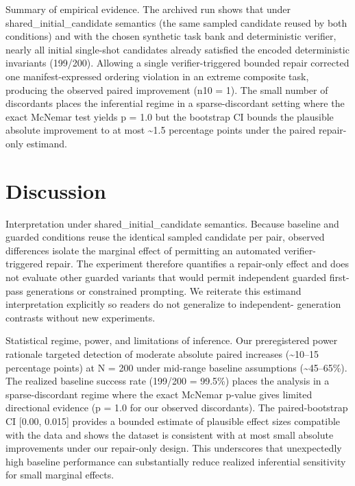 \documentclass[conference]{IEEEtran}
\begin{document}
Summary of empirical evidence. The archived run shows that under shared\_initial\_candidate semantics (the same sampled candidate reused by both conditions) and with the chosen synthetic task bank and deterministic verifier, nearly all initial single-shot candidates already satisfied the encoded deterministic invariants (199/200). Allowing a single verifier-triggered bounded repair corrected one manifest-expressed ordering violation in an extreme composite task, producing the observed paired improvement (n10 = 1). The small number of discordants places the inferential regime in a sparse-discordant setting where the exact McNemar test yields p = 1.0 but the bootstrap CI bounds the plausible absolute improvement to at most \textasciitilde{}1.5 percentage points under the paired repair-only estimand.

\section{Discussion}
Interpretation under shared\_initial\_candidate semantics. Because baseline and guarded conditions reuse the identical sampled candidate per pair, observed differences isolate the marginal effect of permitting an automated verifier-triggered repair. The experiment therefore quantifies a repair-only effect and does not evaluate other guarded variants that would permit independent guarded first-pass generations or constrained prompting. We reiterate this estimand interpretation explicitly so readers do not generalize to independent- generation contrasts without new experiments.

Statistical regime, power, and limitations of inference. Our preregistered power rationale targeted detection of moderate absolute paired increases (\textasciitilde{}10--15 percentage points) at N = 200 under mid-range baseline assumptions (\textasciitilde{}45--65\%). The realized baseline success rate (199/200 = 99.5\%) places the analysis in a sparse-discordant regime where the exact McNemar p-value gives limited directional evidence (p = 1.0 for our observed discordants). The paired-bootstrap CI [0.00, 0.015] provides a bounded estimate of plausible effect sizes compatible with the data and shows the dataset is consistent with at most small absolute improvements under our repair-only design. This underscores that unexpectedly high baseline performance can substantially reduce realized inferential sensitivity for small marginal effects.
\end{document}
